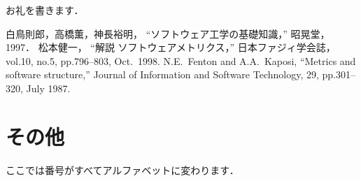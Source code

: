 \documentclass{thesis}
\begin{document}
\acknowledgement

お礼を書きます．

\begin{thebibliography}{99}
白鳥則郎，高橋薫，神長裕明，
``ソフトウェア工学の基礎知識，''
昭晃堂，1997．
%
松本健一，
``解説 ソフトウェアメトリクス，'' 
日本ファジィ学会誌，vol.10, no.5, pp.796--803, Oct.\ 1998.
%
N.E.\ Fenton and A.A.\ Kaposi, 
``Metrics and software structure,''
Journal of Information and Software Technology,
29, pp.301--320, July 1987.
\end{thebibliography}

\appendix

\chapter{その他}

ここでは番号がすべてアルファベットに変わります．
\end{document}

